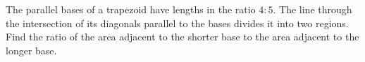 The parallel bases of a trapezoid have lengths in the ratio $4:5$. The line through the intersection of its diagonals parallel to the bases divides it into two regions. Find the ratio of the area adjacent to the shorter base to the area adjacent to the longer base.
